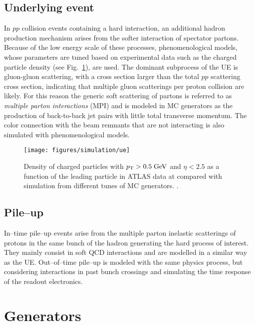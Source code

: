 \subsection{Underlying event}
\label{sec:underlyingevent}

In $pp$ collision events containing a hard interaction, an additional
hadron production mechanism arises from the softer interaction of
spectator partons. Because of the low energy scale of these processes,
phenomenological models, whose parameters are tuned based on
experimental data such as the charged particle density (see
Fig.~\ref{fig:ue}), are used.
The dominant subprocess of the UE is gluon-gluon
scattering, with a cross section larger than the total $pp$ scattering
cross section, indicating that multiple gluon scatterings per proton
collision are likely. 
For this reason the generic soft scattering of partons is referred to
as {\it multiple parton interactions} (MPI) and is modeled in MC
generators as the production of back-to-back jet pairs with little
total transverse momentum. 
The color connection with the beam remnants that are not
interacting is also simulated with phenomenological models.

\begin{figure}[htb]\centering
  \texttt{[image: figures/simulation/ue]}
\caption{
Density of charged particles with $p_{\mathrm{T}}{}>0.5\; \mathrm{GeV}{}$ and $\eta<2.5$ as a function of
the leading particle \pt{} in ATLAS data at \seventev{} compared with
simulation from different tunes of MC generators.
\cite{Aad:2010fh}.}
\label{fig:ue}
\end{figure}

\subsection{Pile--up}
\label{sec:MCpileup}

In--time pile--up events arise from the multiple parton inelastic scatterings 
of protons in the same bunch of the hadron generating the hard process
of interest. They mainly consist in soft QCD interactions and are
modelled in a similar way as the UE. 
Out--of--time pile--up is modeled with the same physics process, but
considering interactions in past bunch crossings and simulating the
time response of the readout electronics.

\section{Generators}
\label{sec:generators}

